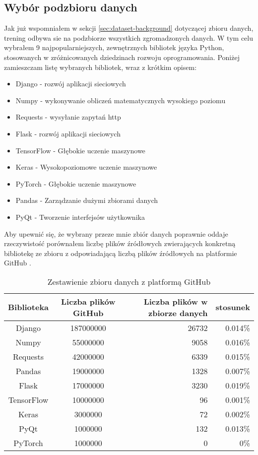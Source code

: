 \subsection{Wybór podzbioru danych}
Jak już wspomniałem w sekcji \ref{sec:dataset-background} dotyczącej zbioru danych, trening odbywa sie na podzbiorze wszystkich zgromadzonych danych. W tym celu wybrałem 9 najpopularniejszych, 
zewnętrznych bibliotek języka Python, stosowanych w zróżnicowanych dziedzinach rozwoju oprogramowania. Poniżej zamieszczam listę wybranych bibliotek, wraz z krótkim opisem:
\begin{itemize}
    \item Django - rozwój aplikacji sieciowych
    \item Numpy - wykonywanie obliczeń matematycznych wysokiego poziomu
    \item Requests - wysyłanie zapytań http 
    \item Flask - rozwój aplikacji sieciowych  
    \item TensorFlow - Głębokie uczenie maszynowe
    \item Keras - Wysokopoziomowe uczenie maszynowe
    \item PyTorch - Głębokie uczenie maszynowe
    \item Pandas - Zarządzanie dużymi zbiorami danych
    \item PyQt - Tworzenie interfejsów użytkownika
\end{itemize} 
Aby upewnić się, że wybrany przeze mnie zbiór danych poprawnie oddaje rzeczywistość porównałem liczbę plików źródłowych zwierających konkretną bibliotekę ze zbioru z odpowiadającą 
liczbą plików źródłowych na platformie GitHub \cite{github}. 
\begin{table}[!h] \centering
    \caption{Zestawienie zbioru danych z platformą GitHub}
    \label{tab:dataset-compare}
    
    \begin{tabular} {| c | c | r | r |} \hline
        Biblioteka & Liczba plików GitHub & Liczba plików w zbiorze danych & stosunek\\\hline\hline
        Django & 187000000 & 26732 & 0.014\% \\\hline
        Numpy & 55000000 & 9058 & 0.016\% \\ \hline
        Requests & 42000000 & 6339 & 0.015\%\\ \hline
        Pandas & 19000000 & 1328 & 0.007\%\\ \hline
        Flask & 17000000 & 3230 & 0.019\% \\ \hline
        TensorFlow & 10000000 & 96 & 0.001\%\\ \hline
        Keras & 3000000& 72 & 0.002\%\\ \hline
        PyQt & 1000000 & 132 & 0.013\%\\ \hline
        PyTorch & 1000000 & 0 & 0\%\\ \hline
    \end{tabular}
\end{table}

